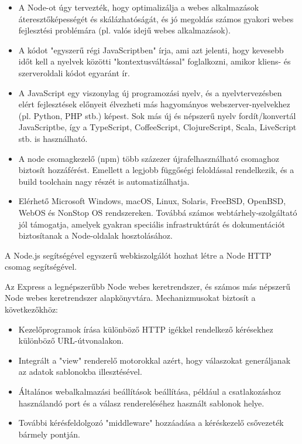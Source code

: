 \begin{itemize}
\item A Node-ot úgy tervezték, hogy optimalizálja a webes alkalmazások áteresztőképességét és skálázhatóságát, és jó megoldás számos gyakori webes fejlesztési problémára (pl. valós idejű webes alkalmazások).
\item A kódot "egyszerű régi JavaScriptben" írja, ami azt jelenti, hogy kevesebb időt kell a nyelvek közötti "kontextusváltással" foglalkozni, amikor kliens- és szerveroldali kódot egyaránt ír.
\item A JavaScript egy viszonylag új programozási nyelv, és a nyelvtervezésben elért fejlesztések előnyeit élvezheti más hagyományos webszerver-nyelvekhez (pl. Python, PHP stb.) képest. Sok más új és népszerű nyelv fordít/konvertál JavaScriptbe, így a TypeScript, CoffeeScript, ClojureScript, Scala, LiveScript stb. is használható.
\item  A node csomagkezelő (npm) több százezer újrafelhasználható csomaghoz biztosít hozzáférést. Emellett a legjobb függőségi feloldással rendelkezik, és a build toolchain nagy részét is automatizálhatja.
\item Elérhető Microsoft Windows, macOS, Linux, Solaris, FreeBSD, OpenBSD, WebOS és NonStop OS rendszereken. Továbbá számos webtárhely-szolgáltató jól támogatja, amelyek gyakran speciális infrastruktúrát és dokumentációt biztosítanak a Node-oldalak hosztolásához.
\end{itemize}

A Node.js segítségével egyszerű webkiszolgálót hozhat létre a Node HTTP csomag segítségével.


Az Express a legnépszerűbb Node webes keretrendszer, és számos más népszerű Node webes keretrendszer alapkönyvtára. Mechanizmusokat biztosít a következőkhöz:

\begin{itemize}
\item Kezelőprogramok írása különböző HTTP igékkel rendelkező kérésekhez különböző URL-útvonalakon.
\item Integrált a "view" renderelő motorokkal azért, hogy válaszokat generáljanak az adatok sablonokba illesztésével.
\item Általános webalkalmazási beállítások beállítása, például a csatlakozáshoz használandó port és a válasz rendereléséhez használt sablonok helye.
\item További kérésfeldolgozó "middleware" hozzáadása a kéréskezelő csővezeték bármely pontján.
\end{itemize}



